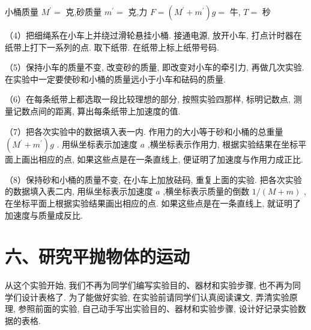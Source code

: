 \documentclass[10pt]{article}
\begin{document}
小桶质量 \({M}^{\prime } =\) 克,砂质量 \({m}^{\prime } =\) 克,力 \(F = \left( {{M}^{\prime } + {m}^{\prime }}\right) g =\) 牛, \(T =\) 秒

\begin{center}
\end{center}

（4）把细绳系在小车上并绕过滑轮悬挂小桶. 接通电源, 放开小车, 打点计时器在纸带上打下一系列的点. 取下纸带. 在纸带上标上纸带号码.

（5）保持小车的质量不变, 改变砂的质量, 即改变对小车的牵引力, 再做几次实验. 在实验中一定要使砂和小桶的质量远小于小车和砝码的质量.

（6）在每条纸带上都选取一段比较理想的部分, 按照实验四那样, 标明记数点, 测量记数点间的距离, 算出每条纸带上加速度的值.

（7）把各次实验中的数据填入表一内. 作用力的大小等于砂和小桶的总重量 \(\left( {{M}^{\prime } + {m}^{\prime }}\right) g\) . 用纵坐标表示加速度 \(a\) ,横坐标表示作用力, 根据实验结果在坐标平面上画出相应的点, 如果这些点是在一条直线上, 便证明了加速度与作用力成正比.

（8）保持砂和小桶的质量不变, 在小车上加放砝码, 重复上面的实验. 把各次实验的数据填入表二内, 用纵坐标表示加速度 \(a\) ,横坐标表示质量的倒数 \(1/\left( {M + m}\right)\) ,在坐标平面上根据实验结果画出相应的点. 如果这些点是在一条直线上, 就证明了加速度与质量成反比.

\section*{六、研究平抛物体的运动}

从这个实验开始, 我们不再为同学们编写实验目的、器材和实验步骤, 也不再为同学们设计表格了. 为了能做好实验, 在实验前请同学们认真阅读课文, 弄清实验原理, 参照前面的实验, 自己动手写出实验目的、器材和实验步骤, 设计好记录实验数据的表格.
\end{document}
